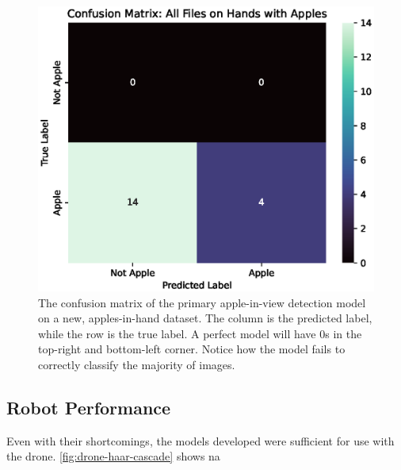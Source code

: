 \begin{figure}[!htb]
    \centering
    \includegraphics[width=\columnwidth,keepaspectratio]
    {./figures/confusion_matrix_All_Files_on_Hands_with_Apples}
    \caption{
        The confusion matrix of the primary apple-in-view detection model on a new, apples-in-hand dataset.
        The column is the predicted label, while the row is the true label.
        A perfect model will have 0s in the top-right and bottom-left corner.
        Notice how the model fails to correctly classify the majority of images.
    }
    \label{fig:apple-in-hand-confusion-matrix}
\end{figure}

\subsection{Robot Performance}\label{subsec:robot-performance}
Even with their shortcomings, the models developed were sufficient for use with the drone.
\autoref{fig:drone-haar-cascade} shows na


